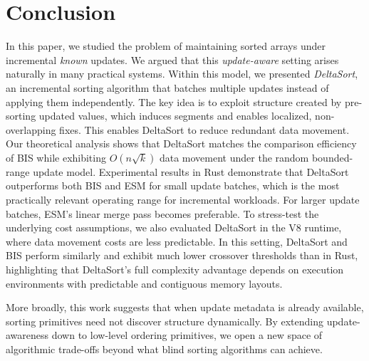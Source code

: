 \section{Conclusion}
\label{sec:conclusion}

In this paper, we studied the problem of maintaining sorted arrays under incremental \emph{known} updates. We argued that this \emph{update-aware} setting arises naturally in many practical systems. Within this model, we presented \emph{DeltaSort}, an incremental sorting algorithm that batches multiple updates instead of applying them independently. The key idea is to exploit structure created by pre-sorting updated values, which induces segments and enables localized, non-overlapping fixes. This enables DeltaSort to reduce redundant data movement. Our theoretical analysis shows that DeltaSort matches the comparison efficiency of BIS while exhibiting $O(n \sqrt{k})$ data movement under the random bounded-range update model. Experimental results in Rust demonstrate that DeltaSort outperforms both BIS and ESM for small update batches, which is the most practically relevant operating range for incremental workloads. For larger update batches, ESM's linear merge pass becomes preferable. To stress-test the underlying cost assumptions, we also evaluated DeltaSort in the V8 runtime, where data movement costs are less predictable. In this setting, DeltaSort and BIS perform similarly and exhibit much lower crossover thresholds than in Rust, highlighting that DeltaSort's full complexity advantage depends on execution environments with predictable and contiguous memory layouts.

More broadly, this work suggests that when update metadata is already available, sorting primitives need not discover structure dynamically. By extending update-awareness down to low-level ordering primitives, we open a new space of algorithmic trade-offs beyond what blind sorting algorithms can achieve.